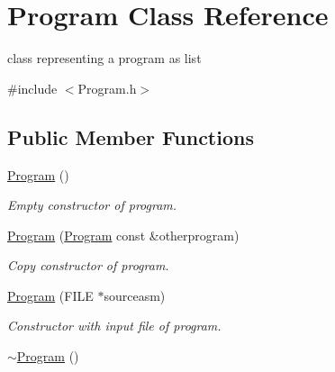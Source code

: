 \hypertarget{classProgram}{
\section{Program Class Reference}
\label{classProgram}
}


class representing a program as list  


{\ttfamily \#include $<$Program.h$>$}\subsection*{Public Member Functions}
\begin{DoxyCompactItemize}
\item 
\hypertarget{classProgram_aaefaa0df08f3484476fc4d61e97acbdc}{
\hyperlink{classProgram_aaefaa0df08f3484476fc4d61e97acbdc}{Program} ()}
\label{classProgram_aaefaa0df08f3484476fc4d61e97acbdc}

\begin{DoxyCompactList}\small\item\em Empty constructor of program. \item\end{DoxyCompactList}\item 
\hypertarget{classProgram_a9918fe797bf830c47a652c81f449c35c}{
\hyperlink{classProgram_a9918fe797bf830c47a652c81f449c35c}{Program} (\hyperlink{classProgram}{Program} const \&otherprogram)}
\label{classProgram_a9918fe797bf830c47a652c81f449c35c}

\begin{DoxyCompactList}\small\item\em Copy constructor of program. \item\end{DoxyCompactList}\item 
\hypertarget{classProgram_a8db47dbd7d0c03848cd4cb75be785088}{
\hyperlink{classProgram_a8db47dbd7d0c03848cd4cb75be785088}{Program} (FILE $\ast$sourceasm)}
\label{classProgram_a8db47dbd7d0c03848cd4cb75be785088}

\begin{DoxyCompactList}\small\item\em Constructor with input file of program. \item\end{DoxyCompactList}\item 
\hypertarget{classProgram_a986aef1c50e1d338a3315a47ba6df549}{
\hyperlink{classProgram_a986aef1c50e1d338a3315a47ba6df549}{$\sim$Program} ()}
\label{classProgram_a986aef1c50e1d338a3315a47ba6df549}


\end{DoxyCompactItemize}
